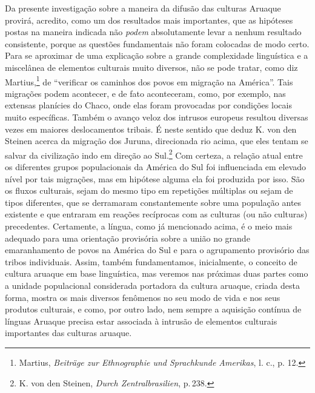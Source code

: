 Da presente investigação sobre a maneira da difusão das culturas
Aruaque provirá, acredito, como um dos resultados mais importantes, que
as hipóteses postas na maneira indicada não \textit{podem} absolutamente
levar a nenhum resultado consistente, porque as questões fundamentais
não foram colocadas de modo certo. Para se aproximar de uma explicação
sobre a grande complexidade linguística e a miscelânea de elementos
culturais muito diversos, não se pode tratar, como diz Martius,\footnote{Martius,
  \textit{Beiträge zur Ethnographie und Sprachkunde Amerikas}, l. c., p.
  12.} de ``verificar os caminhos dos povos em migração na América''.
Tais migrações podem acontecer, e de fato aconteceram, como, por
exemplo, nas extensas planícies do Chaco, onde elas foram provocadas por
condições locais muito específicas. Também o avanço veloz dos intrusos
europeus resultou diversas vezes em maiores deslocamentos tribais.
É neste sentido que deduz K. von den Steinen acerca da migração dos Juruna, direcionada rio
acima, que eles tentam se salvar da civilização indo em direção ao
Sul.\footnote{K. von den Steinen, \textit{Durch Zentralbrasilien}, p.\,238.}
Com certeza, a relação atual entre os diferentes grupos populacionais da
América do Sul foi influenciada em elevado nível por tais migrações, mas
em hipótese alguma ela foi produzida por isso. São os fluxos culturais,
sejam do mesmo tipo em repetições múltiplas ou sejam de tipos
diferentes, que se derramaram constantemente sobre uma população antes
existente e que entraram em reações recíprocas com as culturas (ou
não culturas) precedentes. Certamente, a língua, como já mencionado
acima, é o meio mais adequado para uma orientação provisória sobre a
união no grande emaranhamento de povos na América do Sul e para o
agrupamento provisório das tribos individuais. Assim, também
fundamentamos, inicialmente, o conceito de cultura aruaque em base
linguística, mas veremos nas próximas duas partes como a unidade
populacional considerada portadora da cultura aruaque, criada desta
forma, mostra os mais diversos fenômenos no seu modo de vida e nos seus
produtos culturais, e como, por outro lado, nem sempre a aquisição
contínua de línguas Aruaque precisa estar associada à intrusão de
elementos culturais importantes das culturas aruaque.

